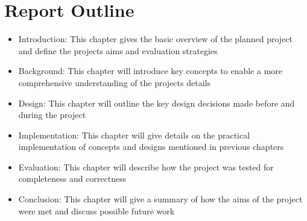\section{Report Outline}
\begin{itemize}
    \item Introduction: This chapter gives the basic overview of the planned project and define the projects aims and evaluation strategies
    \item Background: This chapter will introduce key concepts to enable a more comprehensive understanding of the projects details
    \item Design: This chapter will outline the key design decisions made before and during the project
    \item Implementation: This chapter will give details on the practical implementation of concepts and designs mentioned in previous chapters
    \item Evaluation: This chapter will describe how the project was tested for completeness and correctness
    \item Conclusion: This chapter will give a summary of how the aims of the project were met and discuss possible future work
\end{itemize}

